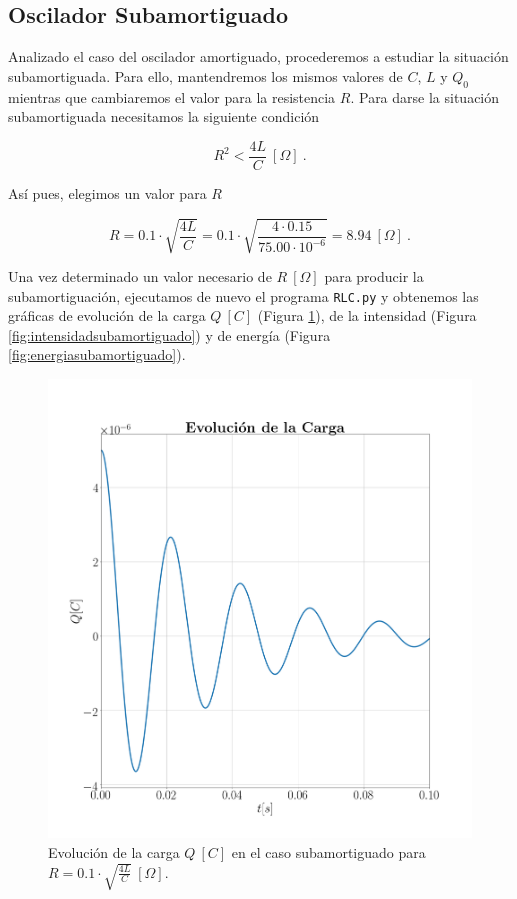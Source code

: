 \documentclass[journal]{IEEEtran}
\begin{document}
\clearpage

\subsection{Oscilador Subamortiguado}
\label{subsec:osciladorsubamortiguado}

Analizado el caso del oscilador amortiguado, procederemos a estudiar la situación subamortiguada. Para ello, mantendremos los mismos valores de $C$, $L$ y $Q_0$ mientras que cambiaremos el valor para la resistencia $R$. Para darse la situación subamortiguada necesitamos la siguiente condición

\begin{equation}
R^2 < \frac{4L}{C}~[\Omega]~.
\end{equation}

Así pues, elegimos un valor para $R$

\begin{equation}
R = 0.1 \cdot \sqrt{\frac{4L}{C}} = 0.1\cdot\sqrt{\frac{4\cdot 0.15}{75.00\cdot10^{-6}}} = 8.94~[\Omega]~.
\end{equation}

Una vez determinado un valor necesario de $R~[\Omega]$ para producir la subamortiguación, ejecutamos de nuevo el programa \texttt{RLC.py} y obtenemos las gráficas de evolución de la carga $Q~[C]$ (Figura \ref{fig:cargasubamortiguado}), de la intensidad (Figura \ref{fig:intensidadsubamortiguado}) y de energía (Figura \ref{fig:energiasubamortiguado}).

\begin{figure}[!htb]
    \centering
    \includegraphics[width=\linewidth,trim={70 70 70 105},clip]{cargasubamortiguado.png}
    \caption{Evolución de la carga $Q~[C]$ en el caso subamortiguado para $R=0.1 \cdot\sqrt{\frac{4L}{C}}~[\Omega]$.}
    \label{fig:cargasubamortiguado}
\end{figure}
\end{document}
